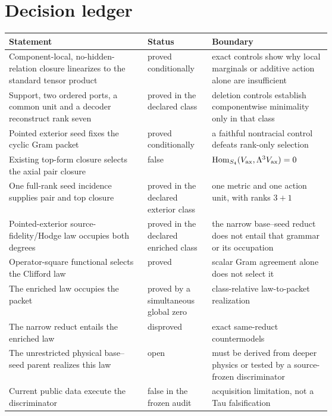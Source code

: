 \documentclass[11pt]{article}
\begin{document}


\section{Decision ledger}

\begin{center}
\small
\begin{tabularx}{0.95\linewidth}{@{}p{0.43\linewidth}p{0.20\linewidth}X@{}}
\toprule
Statement & Status & Boundary\\
\midrule
Component-local, no-hidden-relation closure linearizes to the standard tensor
product & proved conditionally & exact controls show why local marginals or
additive action alone are insufficient\\
Support, two ordered ports, a common unit and a decoder reconstruct rank seven
& proved in the declared class & deletion controls establish componentwise
minimality only in that class\\
Pointed exterior seed fixes the cyclic Gram packet & proved conditionally & a
faithful nontracial control defeats rank-only selection\\
Existing top-form closure selects the axial pair closure & false &
$\operatorname{Hom}_{S_4}(V_{\rm ax},\Lambda^3V_{\rm ax})=0$\\
One full-rank seed incidence supplies pair and top closure & proved in the
declared exterior class & one metric and one action unit, with ranks $3+1$\\
Pointed-exterior source-fidelity/Hodge law occupies both degrees & proved in
the declared enriched class & the narrow base--seed reduct does not entail
that grammar or its occupation\\
Operator-square functional selects the Clifford law & proved & scalar Gram
agreement alone does not select it\\
The enriched law occupies the packet & proved by a simultaneous global zero &
class-relative law-to-packet realization\\
The narrow reduct entails the enriched law & disproved & exact same-reduct
countermodels\\
The unrestricted physical base--seed parent realizes this law & open & must be
derived from deeper physics or tested by a source-frozen discriminator\\
Current public data execute the discriminator & false in the frozen audit &
acquisition limitation, not a Tau falsification\\
\bottomrule
\end{tabularx}
\end{center}
\end{document}

